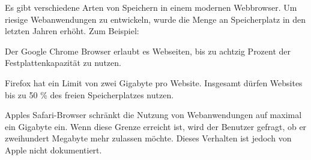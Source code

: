 
Es gibt verschiedene Arten von Speichern in einem modernen Webbrowser. Um riesige Webanwendungen zu entwickeln, wurde die Menge an Speicherplatz in den letzten Jahren erhöht. Zum Beispiel:

Der Google Chrome Browser erlaubt es Webseiten, bis zu achtzig Prozent der Festplattenkapazität zu nutzen.

Firefox hat ein Limit von zwei Gigabyte pro Website. Insgesamt dürfen Websites bis zu 50 \% des freien Speicherplatzes nutzen.

Apples Safari-Browser schränkt die Nutzung von Webanwendungen auf maximal ein Gigabyte ein. Wenn diese Grenze erreicht ist, wird der Benutzer gefragt, ob er zweihundert Megabyte mehr zulassen möchte. Dieses Verhalten ist jedoch von Apple nicht dokumentiert.






